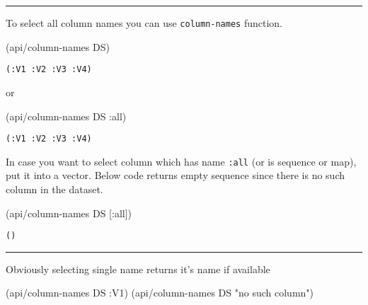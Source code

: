 \documentclass[]{article}
\newenvironment{Shaded}{\begin{snugshade}}{\end{snugshade}}
\newcommand{\StringTok}[1]{\textcolor[rgb]{0.31,0.60,0.02}{#1}}
\newcommand{\AttributeTok}[1]{\textcolor[rgb]{0.77,0.63,0.00}{#1}}
\newcommand{\NormalTok}[1]{#1}
\begin{document}
\begin{center}\rule{0.5\linewidth}{0.5pt}\end{center}

To select all column names you can use \texttt{column-names} function.

\begin{Shaded}
\begin{Highlighting}[]
\NormalTok{(api/column-names DS)}
\end{Highlighting}
\end{Shaded}

\begin{verbatim}
(:V1 :V2 :V3 :V4)
\end{verbatim}

or

\begin{Shaded}
\begin{Highlighting}[]
\NormalTok{(api/column-names DS }\AttributeTok{:all}\NormalTok{)}
\end{Highlighting}
\end{Shaded}

\begin{verbatim}
(:V1 :V2 :V3 :V4)
\end{verbatim}

In case you want to select column which has name \texttt{:all} (or is
sequence or map), put it into a vector. Below code returns empty
sequence since there is no such column in the dataset.

\begin{Shaded}
\begin{Highlighting}[]
\NormalTok{(api/column-names DS [}\AttributeTok{:all}\NormalTok{])}
\end{Highlighting}
\end{Shaded}

\begin{verbatim}
()
\end{verbatim}

\begin{center}\rule{0.5\linewidth}{0.5pt}\end{center}

Obviously selecting single name returns it's name if available

\begin{Shaded}
\begin{Highlighting}[]
\NormalTok{(api/column-names DS }\AttributeTok{:V1}\NormalTok{)}
\NormalTok{(api/column-names DS }\StringTok{"no such column"}\NormalTok{)}
\end{Highlighting}
\end{Shaded}
\end{document}
